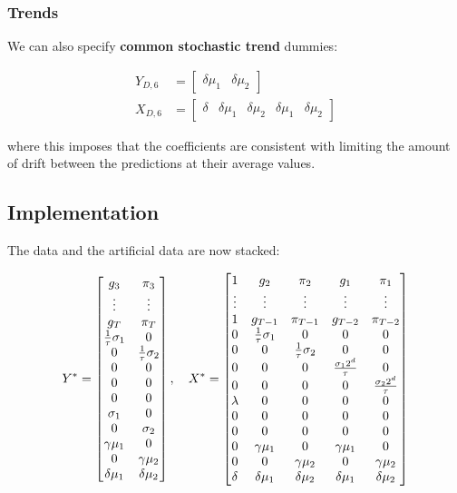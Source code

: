 \documentclass[
  letterpaper,
]{book}
\begin{document}
\hypertarget{trends}{%
\subsubsection{Trends}\label{trends}}

We can also specify \textbf{common stochastic trend} dummies:

\begin{align*}
  Y_{D,6} &= \left[\begin{matrix}\delta\mu_1 & \delta\mu_2 \end{matrix}\right] \\
  X_{D,6} &= \left [\begin{matrix}\delta & \delta\mu_1 & \delta\mu_2 & \delta\mu_1 & \delta\mu_2 \end{matrix}\right]
\end{align*}

where this imposes that the coefficients are consistent with limiting
the amount of drift between the predictions at their average values.

\hypertarget{implementation}{%
\subsection{Implementation}\label{implementation}}

The data and the artificial data are now stacked:

\begin{equation}
  Y^* = \left[\begin{matrix} g_3 & \pi_3 \cr
    \vdots & \vdots \cr
    g_T & \pi_T \cr
    \frac{1}{\tau}\sigma_1 & 0 \cr
    0 & \frac{1}{\tau}\sigma_2\cr
    0 & 0 \cr
    0 & 0 \cr
    0 & 0 \cr
    \sigma_1 & 0 \cr
    0 & \sigma_2 \cr
    \gamma\mu_1 & 0 \cr
    0 & \gamma\mu_2 \cr
    \delta\mu_1 & \delta\mu_2 \end{matrix}\right], \quad
X^* = \left [ \begin{matrix}1 & g_2 & \pi_2 & g_1 & \pi_1 \cr
  \vdots & \vdots & \vdots & \vdots & \vdots \cr
  1 & g_{T-1} & \pi_{T-1} & g_{T-2} & \pi_{T-2} \cr
  0 & \frac{1}{\tau}\sigma_1 & 0 & 0 & 0\cr
  0 & 0 & \frac{1}{\tau}\sigma_2 & 0 & 0\cr
  0 & 0 & 0 & \frac{\sigma_1 2^d}{\tau} & 0 \cr
  0 & 0 & 0 & 0 & \frac{\sigma_2 2^d}{\tau} \cr
  \lambda & 0 & 0 & 0 & 0 \cr
  0 & 0 & 0 & 0 & 0 \cr
  0 & 0 & 0 & 0 & 0 \cr
  0 & \gamma\mu_1 & 0 & \gamma\mu_1 & 0 \cr
  0 & 0 & \gamma\mu_2 & 0 & \gamma\mu_2 \cr
  \delta & \delta\mu_1 & \delta\mu_2 & \delta\mu_1 & \delta\mu_2 \end{matrix}\right]
\end{equation}
\end{document}
